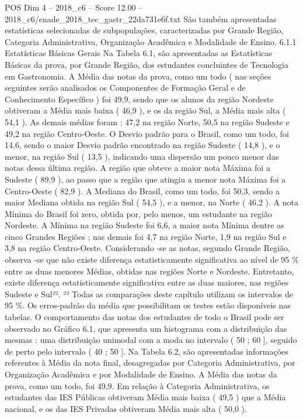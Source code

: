 \begin{textsample}{POS Dim 4 – 2018\_c6 – Score 12.00 – 2018\_c6/enade\_2018\_tec\_gastr\_22da731e6f.txt}
São também apresentadas estatísticas selecionadas de subpopulações, caracterizadas por Grande Região, Categoria Administrativa, Organização Acadêmica e Modalidade de Ensino. 6.1.1 Estatísticas Básicas Gerais Na Tabela 6.1, são apresentadas as Estatísticas Básicas da prova, por Grande Região, dos estudantes concluintes de Tecnologia em Gastronomia.
A Média das notas da prova, como um todo ( nas seções seguintes serão analisados os Componentes de Formação Geral e de Conhecimento Específico ) foi 49,9, sendo que os alunos da região Nordeste obtiveram a Média mais baixa ( 46,9 ), e os da região Sul, a Média mais alta ( 54,1 ).
As demais médias foram : 47,2 na região Norte, 50,5 na região Sudeste e 49,2 na região Centro-Oeste.
O Desvio padrão para o Brasil, como um todo, foi 14,6, sendo o maior Desvio padrão encontrado na região Sudeste ( 14,8 ), e o menor, na região Sul ( 13,5 ), indicando uma dispersão um pouco menor das notas dessa última região.
A região que obteve a maior nota Máxima foi a Sudeste ( 89,9 ), ao passo que a região que atingiu a menor nota Máxima foi a Centro-Oeste ( 82,9 ).
A Mediana do Brasil, como um todo, foi 50,3, sendo a maior Mediana obtida na região Sul ( 54,5 ), e a menor, na Norte ( 46,2 ).
A nota Mínima do Brasil foi zero, obtida por, pelo menos, um estudante na região Nordeste.
A Mínima na região Sudeste foi 6,6, a maior nota Mínima dentre as cinco Grandes Regiões ; nas demais foi 4,7 na região Norte, 1,9 na região Sul e 3,8 na região Centro-Oeste.
Considerando -se as notas, segundo Grande Região, observa -se que não existe diferença estatisticamente significativa ao nível de 95 \% entre as duas menores Médias, obtidas nas regiões Norte e Nordeste.
Entretanto, existe diferença estatisticamente significativa entre as duas maiores, nas regiões Sudeste e Sul²². ²² Todas as comparações deste capítulo utilizam os intervalos de 95 \%.
Os erros-padrão da média que possibilitam os testes estão disponíveis nas tabelas.
O comportamento das notas dos estudantes de todo o Brasil pode ser observado no Gráfico 6.1, que apresenta um histograma com a distribuição das mesmas : uma distribuição unimodal com a moda no intervalo ( 50 ; 60 ], seguido de perto pelo intervalo ( 40 ; 50 ].
Na Tabela 6.2, são apresentadas informações referentes à Média da nota final, desagregadas por Categoria Administrativa, por Organização Acadêmica e por Modalidade de Ensino.
A Média das notas da prova, como um todo, foi 49,9.
Em relação à Categoria Administrativa, os estudantes das IES Públicas obtiveram Média mais baixa ( 49,5 ) que a Média nacional, e os das IES Privadas obtiveram Média mais alta ( 50,0 ).

\end{textsample}

